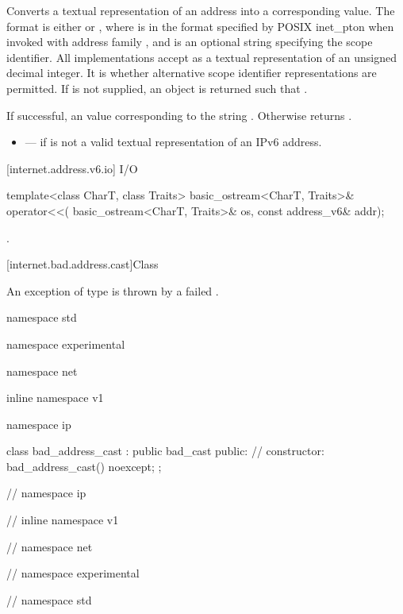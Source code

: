 \begin{itemdescr}
\pnum
\effects Converts a textual representation of an address into a corresponding  value. The format is either  or \tcode{\%}, where  is in the format specified by POSIX inet_pton when invoked with address family , and  is an optional string specifying the scope identifier. All implementations accept as  a textual representation of an unsigned decimal integer. It is  whether alternative scope identifier representations are permitted. If  is not supplied, an  object is returned such that .

\pnum
\returns If successful, an  value corresponding to the string . Otherwise returns .

\pnum
\errors
\begin{itemize}
\item
{} --- if  is not a valid textual representation of an IPv6 address.
\end{itemize}
\end{itemdescr}



[internet.address.v6.io]{ I/O}

%
\begin{itemdecl}
template<class CharT, class Traits>
  basic_ostream<CharT, Traits>& operator<<(
    basic_ostream<CharT, Traits>& os, const address_v6& addr);
\end{itemdecl}

\begin{itemdescr}
\pnum
\returns {}.
\end{itemdescr}




%
[internet.bad.address.cast]{Class }

\pnum
An exception of type  is thrown by a failed .

\begin{codeblock}
namespace std {
namespace experimental {
namespace net {
inline namespace v1 {
namespace ip {

  class bad_address_cast : public bad_cast
  {
  public:
    // constructor:
    bad_address_cast() noexcept;
  };

} // namespace ip
} // inline namespace v1
} // namespace net
} // namespace experimental
} // namespace std
\end{codeblock}

